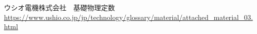 
\begin{thebibliography}{99}
    \setcounter{num}{2}
    \bibitem{}ウシオ電機株式会社　基礎物理定数　\url{https://www.ushio.co.jp/jp/technology/glossary/material/attached_material_03.html}
\end{thebibliography}